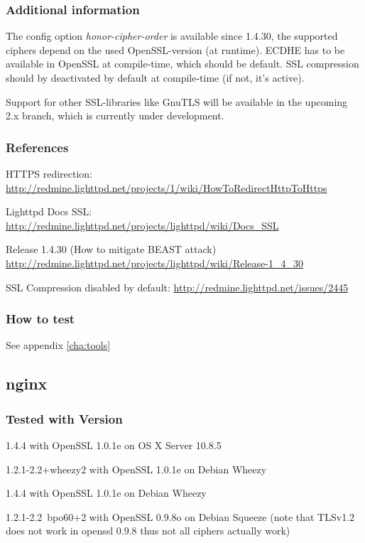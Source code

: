 
\subsubsection{Additional information} 
The config option \emph{honor-cipher-order} is available since 1.4.30, the
supported ciphers depend on the used OpenSSL-version (at runtime). ECDHE has to
be available in OpenSSL at compile-time, which should be default. SSL
compression should by deactivated by default at compile-time (if not, it's
active).

Support for other SSL-libraries like GnuTLS will be available in the upcoming
2.x branch, which is currently under development.


\subsubsection{References} 
\begin{itemize*}
  \item HTTPS redirection: \url{http://redmine.lighttpd.net/projects/1/wiki/HowToRedirectHttpToHttps}
  \item Lighttpd Docs SSL: \url{http://redmine.lighttpd.net/projects/lighttpd/wiki/Docs\_SSL}
  \item Release 1.4.30 (How to mitigate BEAST attack) \url{http://redmine.lighttpd.net/projects/lighttpd/wiki/Release-1\_4\_30}
  \item SSL Compression disabled by default: \url{http://redmine.lighttpd.net/issues/2445}
\end{itemize*}


\subsubsection{How to test} 
See appendix \ref{cha:tools}


\subsection{nginx}

\subsubsection{Tested with Version} 
\begin{itemize*}
  \item 1.4.4 with OpenSSL 1.0.1e on OS X Server 10.8.5
  \item 1.2.1-2.2+wheezy2 with OpenSSL 1.0.1e on Debian Wheezy
  \item 1.4.4 with OpenSSL 1.0.1e on Debian Wheezy
  \item 1.2.1-2.2~bpo60+2 with OpenSSL 0.9.8o on Debian Squeeze (note that TLSv1.2 does not work in openssl 0.9.8 thus not all ciphers actually work)
\end{itemize*}


